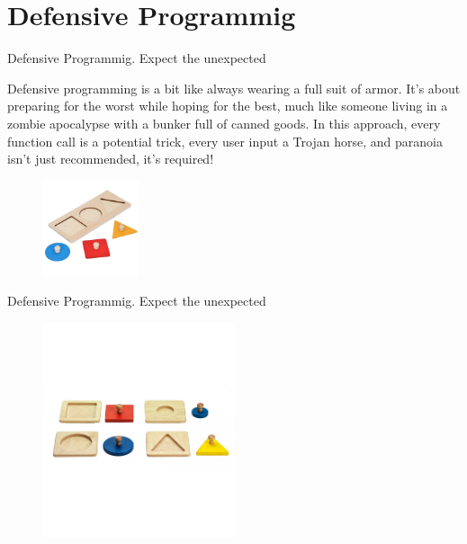 \documentclass[10pt]{beamer}
\begin{document}
\section{Defensive Programmig}

\begin{frame}{Defensive Programmig. Expect the unexpected}
  
Defensive programming is a bit like always wearing a full suit of armor. It’s about preparing for the worst while hoping for the best, much like someone living in a zombie apocalypse with a bunker full of canned goods. In this approach, every function call is a potential trick, every user input a Trojan horse, and paranoia isn’t just recommended, it’s required!

\begin{figure}[h]
  \centering
  \includegraphics[width=0.25\textwidth]{figures/BadDummpyProof.png}
  \label{fig:BadDummpyProof}
\end{figure}


\end{frame}

\begin{frame}{Defensive Programmig. Expect the unexpected}
  
  \begin{figure}[h]
    \centering
    \includegraphics[width=0.5\textwidth]{figures/GoodDummyProof.png}
    \label{fig:BadDummpyProof}
  \end{figure}
\end{frame}
\end{document}
